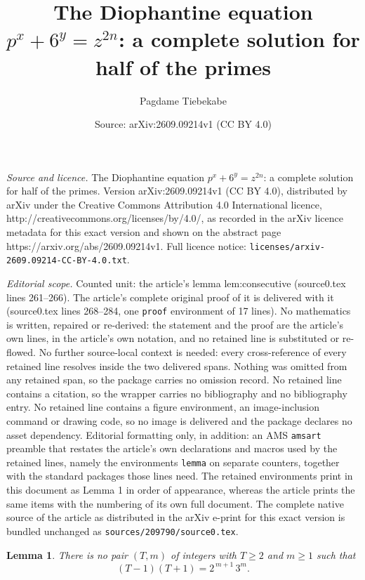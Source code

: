 \documentclass[10pt,a4paper]{amsart}
\title{The Diophantine equation $p^{x}+6^{y}=z^{2n}$: a complete solution for half of the primes}
\author{Pagdame Tiebekabe}
\date{Source: arXiv:2609.09214v1 (CC BY 4.0)}
\newtheorem{lemma}{Lemma}
\begin{document}
\maketitle

\noindent\emph{Source and licence.} The Diophantine equation $p^{x}+6^{y}=z^{2n}$: a complete solution for half of the primes. Version arXiv:2609.09214v1 (CC BY 4.0), distributed by arXiv under the Creative Commons Attribution 4.0 International licence, http://creativecommons.org/licenses/by/4.0/, as recorded in the arXiv licence metadata for this exact version and shown on the abstract page https://arxiv.org/abs/2609.09214v1. Full licence notice: \texttt{licenses/arxiv-2609.09214-CC-BY-4.0.txt}.\par\smallskip

\noindent\textit{Editorial scope.} Counted unit: the article's lemma lem:consecutive (source0.tex lines 261--266). The article's complete original proof of it is delivered with it (source0.tex lines 268--284, one \texttt{proof} environment of 17 lines). No mathematics is written, repaired or re-derived: the statement and the proof are the article's own lines, in the article's own notation, and no retained line is substituted or re-flowed.  No further source-local context is needed: every cross-reference of every retained line resolves inside the two delivered spans.  Nothing was omitted from any retained span, so the package carries no omission record.  No retained line contains a citation, so the wrapper carries no bibliography and no bibliography entry.  No retained line contains a figure environment, an image-inclusion command or drawing code, so no image is delivered and the package declares no asset dependency.  Editorial formatting only, in addition: an AMS \texttt{amsart} preamble that restates the article's own declarations and macros used by the retained lines, namely the environments \texttt{lemma} on separate counters, together with the standard packages those lines need.  The retained environments print in this document as Lemma 1 in order of appearance, whereas the article prints the same items with the numbering of its own full document.  The complete native source of the article as distributed in the arXiv e-print for this exact version is bundled unchanged as \texttt{sources/209790/source0.tex}.
\begin{lemma}\label{lem:consecutive}
There is no pair $(T,m)$ of integers with $T\geq 2$ and $m\geq 1$ such that
\[
(T-1)(T+1)=2^{\,m+1}\,3^{m}.
\]
\end{lemma}
\end{document}
